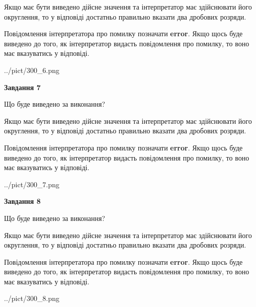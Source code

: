 \documentclass[12pt, ukrainian]{article}
\begin{document}
{\begin {Large}
Якщо має бути виведено дійсне значення та інтерпретатор має здійснювати його округлення, 
то у відповіді достатньо правильно вказати два дробових розряди.

Повідомлення інтерпретатора про помилку позначати \textbf{error}.
Якщо щось буде виведено до того, як інтерпретатор видасть повідомлення про помилку, 
то воно має вказуватись у відповіді. \par

\begin{center}
	{../pict/300_6.png}
\end{center}
\newpage

{\begin {center}\textbf{Завдання 7}\end {center}}\par
Що буде виведено за виконання? \par

Якщо має бути виведено дійсне значення та інтерпретатор має здійснювати його округлення, 
то у відповіді достатньо правильно вказати два дробових розряди.

Повідомлення інтерпретатора про помилку позначати \textbf{error}.
Якщо щось буде виведено до того, як інтерпретатор видасть повідомлення про помилку, 
то воно має вказуватись у відповіді. \par

\begin{center}
	{../pict/300_7.png}
\end{center}
\newpage

{\begin {center}\textbf{Завдання 8}\end {center}}\par
Що буде виведено за виконання? \par

Якщо має бути виведено дійсне значення та інтерпретатор має здійснювати його округлення, 
то у відповіді достатньо правильно вказати два дробових розряди.

Повідомлення інтерпретатора про помилку позначати \textbf{error}.
Якщо щось буде виведено до того, як інтерпретатор видасть повідомлення про помилку, 
то воно має вказуватись у відповіді. \par

\begin{center}
	{../pict/300_8.png}
\end{center}
\newpage


\end{Large}}
\end{document}
